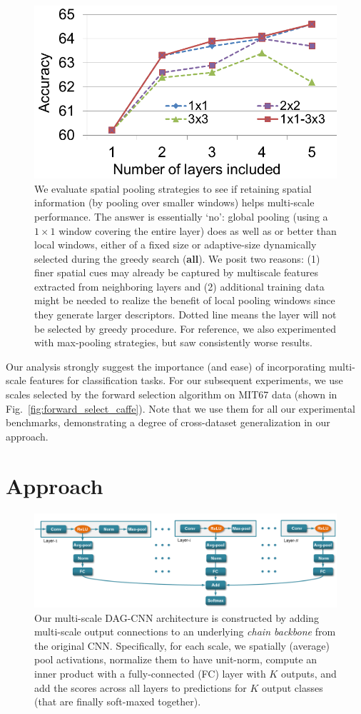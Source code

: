 \documentclass[10pt,twocolumn,letterpaper]{article}
\begin{document}
\begin{figure}[t!]
\centering
\includegraphics[width=.7\columnwidth]{fig/sumpool_size}
\caption{We evaluate spatial pooling strategies to see if retaining spatial information (by pooling over smaller windows) helps multi-scale performance. The answer is essentially `no': global pooling (using a $1\times 1$ window covering the entire layer) does as well as or better than local windows, either of a fixed size or adaptive-size dynamically selected during the greedy search ({\bf all}). We posit two reasons: (1) finer spatial cues may already be captured by multiscale features extracted from neighboring layers and (2) additional training data might be needed to realize the benefit of local pooling windows since they generate larger descriptors. Dotted line means the layer will not be selected by greedy procedure. For reference, we also experimented with max-pooling strategies, but saw consistently worse results.}
\label{fig:pool_size}
\end{figure}


Our analysis strongly suggest the importance (and ease) of incorporating multi-scale features for classification tasks. For our subsequent experiments, we use scales selected by the forward selection algorithm on MIT67 data (shown in Fig.~\ref{fig:forward_select_caffe}). Note that we use them for all our experimental benchmarks, demonstrating a degree of cross-dataset generalization in our approach. 

\section{Approach\label{sec:approach}} 

\begin{figure}[t!]
\centering
	\includegraphics[width=.9\textwidth]{fig/fig_model}
\caption{Our multi-scale DAG-CNN architecture is constructed by adding multi-scale output connections to an underlying {\em chain backbone} from the original CNN. Specifically, for each scale, we spatially (average) pool activations, normalize them to have unit-norm, compute an inner product with a fully-connected (FC) layer with $K$ outputs, and add the scores across all layers to predictions for $K$ output classes (that are finally soft-maxed together).}
\label{fig:model}
\end{figure}
\end{document}
